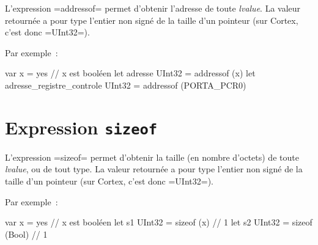 L'expression \plm=addressof= permet d'obtenir l'adresse de toute \emph{lvalue}. La valeur retournée a pour type l'entier non signé de la taille d'un pointeur (sur Cortex, c'est donc \plm=UInt32=).

Par exemple~:
\begin{PLM}
var x = yes // x est booléen
let adresse UInt32 = addressof (x)
let adresse_registre_controle UInt32 = addressof (PORTA_PCR0)
\end{PLM}




\section{Expression \texttt{sizeof}}


L'expression \plm=sizeof= permet d'obtenir la taille (en nombre d'octets) de toute \emph{lvalue}, ou de tout type. La valeur retournée a pour type l'entier non signé de la taille d'un pointeur (sur Cortex, c'est donc \plm=UInt32=).

Par exemple~:
\begin{PLM}
var x = yes // x est booléen
let s1 UInt32 = sizeof (x) // 1
let s2 UInt32 = sizeof (Bool) // 1
\end{PLM}

